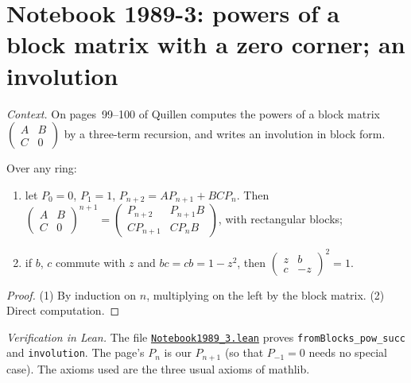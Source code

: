 \section[Notebook 1989-3: powers of a block matrix]{Notebook 1989-3: powers of a block matrix with a zero corner; an involution\protect{}}\label{sec:quillen-1989-3}

\emph{Context.} On pages~99--100 of  Quillen computes the powers of a block matrix $\begin{pmatrix}A & B\\ C & 0\end{pmatrix}$ by a three-term recursion, and writes an involution in block form.

\begin{encadre}
\begin{theoreme}\label{thm:quillen-1989-3}
Over any ring:
\begin{enumerate}
\item let $P_0 = 0$, $P_1 = 1$, $P_{n+2} = AP_{n+1} + BCP_n$. Then $\begin{pmatrix}A & B\\ C & 0\end{pmatrix}^{n+1} = \begin{pmatrix}P_{n+2} & P_{n+1}B\\ CP_{n+1} & CP_nB\end{pmatrix}$, with rectangular blocks;
\item if $b$, $c$ commute with $z$ and $bc = cb = 1 - z^2$, then $\begin{pmatrix}z & b\\ c & -z\end{pmatrix}^2 = 1$.
\end{enumerate}
\end{theoreme}
\end{encadre}

\begin{proof}
(1) By induction on $n$, multiplying on the left by the block matrix. (2) Direct computation.
\end{proof}

\emph{Verification in Lean.} The file \href{\leanblobmain/Notebook1989_3.lean}{\texttt{Notebook1989\_3.\allowbreak{}lean}} proves \texttt{fromBlocks\_pow\_succ} and \texttt{involution}. The page's $P_n$ is our $P_{n+1}$ (so that $P_{-1} = 0$ needs no special case). The axioms used are the three usual axioms of mathlib.

